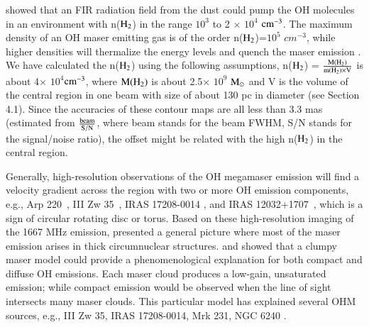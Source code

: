 \documentclass[]{aa} %
\begin{document}
\cite{2009ASPC..407...73B} showed that an FIR radiation field from the dust could pump the OH molecules in an environment with n($\rm H_{2}$) in the range $10^{3}$ to 2 $\times$ $10^{4}$ $\rm cm^{-3}$. The maximum density of an OH maser emitting gas is of the order n($\rm H_{2}$)=$10^{5}$ $cm^{-3}$, while higher densities will thermalize the
energy levels and quench the maser emission \citep{2005A&A...443..383P}. We have calculated the n($\rm H_{2}$) using the following assumptions,  n($\rm H_{2}$) = $\rm \frac{M(H_{2})}{m(H_{2}) \times V}$ is about 4$\times$ $10^{4}$$\rm cm^{-3}$, where $\rm M(H_{2})$ is about 2.5$\times$ $10^{9}$ $\rm M_{\odot}$ and V is the volume of the central region in one beam with size of about 130 pc in diameter (see Section 4.1).  Since the accuracies of these contour maps are all less than 3.3 mas (estimated from $\rm \frac{beam}{S/N}$, where beam stands for the beam FWHM, S/N stands for the signal/noise ratio), the offset might be related with the high n($\rm H_{2}$) in the central region.



  Generally, high-resolution observations of the OH megamaser emission will find a velocity gradient across the region with two or more OH emission components, e.g., Arp 220~\citep{2009AJ....138.1529U}, III Zw 35~\citep{1997ApJ...485L..79T}, IRAS 17208-0014 \citep{2006ApJ...653.1172M}, and IRAS 12032+1707~\citep{2005ApJ...618..705P}, which is a sign of circular rotating disc or torus. Based on these high-resolution imaging of the 1667 MHz emission,  \cite{2007IAUS..242..446P}  presented a general picture where most of the maser emission arises in thick circumnuclear structures. \cite{2005A&A...443..383P} and \cite{2008ApJ...677..985L} showed that a clumpy maser model could provide a phenomenological explanation for both compact and diffuse OH emissions. Each maser cloud produces a low-gain, unsaturated emission; while compact emission would be observed when the line of sight intersects many maser clouds. This particular model has explained several OHM sources, e.g., III Zw 35, IRAS 17208-0014, Mrk 231, NGC 6240 \citep{2008ApJ...677..985L}.
\end{document}
